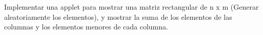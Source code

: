 Implementar una applet para mostrar una matriz rectangular de n x m (Generar aleatoriamente los elementos), y mostrar la suma de los elementos de las columnas y los elementos menores de cada columna.